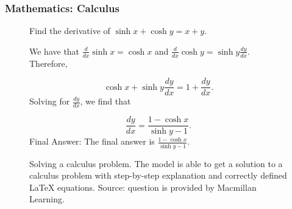 \subsubsection{Mathematics: Calculus}
\vspace{-5mm}
\begin{figure}[h!]
 \noindent\begin{tcolorbox}[nobeforeafter, title=Prompt, colframe=darkgray, colback=white]

Find the derivative of $\sinh{x} + \cosh{y} = x + y$.

\end{tcolorbox}

\noindent\begin{tcolorbox}[nobeforeafter, title=Model Response (rendered latex), colframe=darkgray, colback=white]

We have that $\frac{d}{dx}\sinh{x}=\cosh{x}$ and $\frac{d}{dx}\cosh{y}=\sinh{y}\frac{dy}{dx}$.  Therefore,

$$\cosh{x}+\sinh{y}\frac{dy}{dx}=1+\frac{dy}{dx}.$$Solving for $\frac{dy}{dx}$, we find that

$$\frac{dy}{dx}=\frac{1-\cosh{x}}{\sinh{y}-1}.$$
Final Answer: The final answer is $\frac{1-\cosh{x}}{\sinh{y}-1}$.

\end{tcolorbox}

\caption{Solving a calculus problem. The model is able to get a solution to a calculus problem with step-by-step explanation and correctly defined LaTeX equations.  \newline Source: question is provided by Macmillan Learning.}
\label{fig:demo_example13}
\end{figure}

\clearpage

